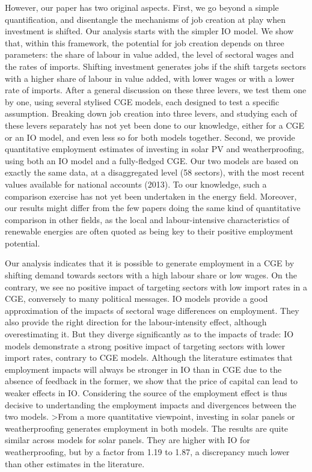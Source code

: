 However, our paper has two original aspects. 
First, we go beyond a simple quantification, and disentangle the mechanisms of job creation at play when investment is shifted. 
Our analysis starts with the simpler IO model. We show that, within this framework, the potential for job creation depends on three parameters: the share of labour in value added, the level of sectoral wages and the rates of imports. Shifting investment generates jobs if the shift targets sectors with a higher share of labour in value added, with lower wages or with a lower rate of imports. After a general discussion on these three levers, we test them one by one, using several stylised CGE models, each designed to test a specific assumption.
Breaking down job creation into three levers, and studying each of these levers separately has not yet been done to our knowledge, either for a CGE or an IO model, and even less so for both models together.
Second, we provide quantitative employment estimates of investing in solar PV and weatherproofing, using both an IO model and a fully-fledged CGE. Our two models are based on exactly the same data, at a disaggregated level (58 sectors), with the most recent values available for national accounts (2013). To our knowledge, such a comparison exercise has not yet been undertaken in the energy field. Moreover, our results might differ from the few papers doing the same kind of quantitative comparison in other fields, as the local and labour-intensive characteristics of renewable energies are often quoted as being key to their positive employment potential.

Our analysis indicates that it is possible to generate employment in a CGE by shifting demand towards sectors with a high labour share or low wages. On the contrary, we see no positive impact of targeting sectors with low import rates in a CGE, conversely to many political messages.
IO models provide a good approximation of the impacts of sectoral wage differences on employment. They also provide the right direction for the labour-intensity effect, although overestimating it. But they diverge significantly as to the impacts of trade: IO models demonstrate a strong positive impact of targeting sectors with lower import rates, contrary to CGE models.
Although the literature estimates that employment impacts will always be stronger in IO than in CGE due to the absence of feedback in the former, we show that the price of capital can lead to weaker effects in IO. Considering the source of the employment effect is thus decisive to undertanding the employment impacts and divergences between the two models.
>From a more quantitative viewpoint, investing in solar panels or weatherproofing generates employment in both models. The results are quite similar across models for solar panels. They are higher with IO for weatherproofing, but by a factor from 1.19 to 1.87, a discrepancy much lower than other estimates in the literature. 

